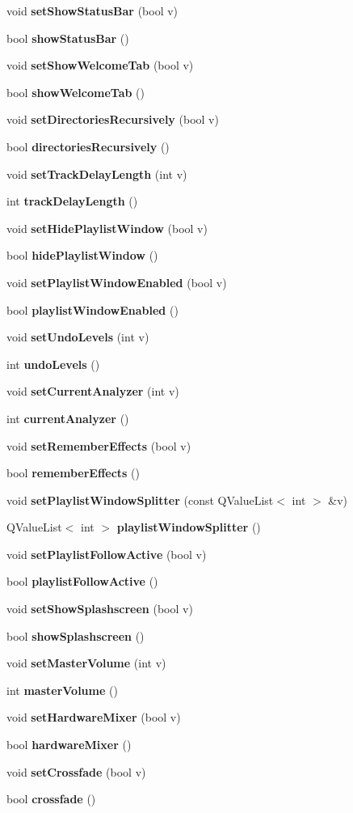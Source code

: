 \begin{CompactItemize}
void {\bf set\-Show\-Status\-Bar} (bool v)
\item 
bool {\bf show\-Status\-Bar} ()
\item 
void {\bf set\-Show\-Welcome\-Tab} (bool v)
\item 
bool {\bf show\-Welcome\-Tab} ()
\item 
void {\bf set\-Directories\-Recursively} (bool v)
\item 
bool {\bf directories\-Recursively} ()
\item 
void {\bf set\-Track\-Delay\-Length} (int v)
\item 
int {\bf track\-Delay\-Length} ()
\item 
void {\bf set\-Hide\-Playlist\-Window} (bool v)
\item 
bool {\bf hide\-Playlist\-Window} ()
\item 
void {\bf set\-Playlist\-Window\-Enabled} (bool v)
\item 
bool {\bf playlist\-Window\-Enabled} ()
\item 
void {\bf set\-Undo\-Levels} (int v)
\item 
int {\bf undo\-Levels} ()
\item 
void {\bf set\-Current\-Analyzer} (int v)
\item 
int {\bf current\-Analyzer} ()
\item 
void {\bf set\-Remember\-Effects} (bool v)
\item 
bool {\bf remember\-Effects} ()
\item 
void {\bf set\-Playlist\-Window\-Splitter} (const QValue\-List$<$ int $>$ \&v)
\item 
QValue\-List$<$ int $>$ {\bf playlist\-Window\-Splitter} ()
\item 
void {\bf set\-Playlist\-Follow\-Active} (bool v)
\item 
bool {\bf playlist\-Follow\-Active} ()
\item 
void {\bf set\-Show\-Splashscreen} (bool v)
\item 
bool {\bf show\-Splashscreen} ()
\item 
void {\bf set\-Master\-Volume} (int v)
\item 
int {\bf master\-Volume} ()
\item 
void {\bf set\-Hardware\-Mixer} (bool v)
\item 
bool {\bf hardware\-Mixer} ()
\item 
void {\bf set\-Crossfade} (bool v)
\item 
bool {\bf crossfade} ()
\item 

\end{CompactItemize}
